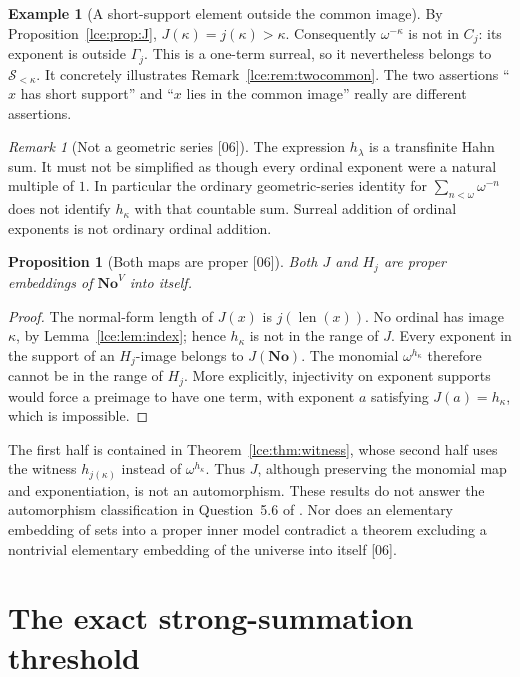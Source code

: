 \documentclass[11pt,letterpaper]{article}
\numberwithin{equation}{section}
\newtheorem{proposition}[theorem]{Proposition}
\theoremstyle{definition}
\newtheorem{example}[theorem]{Example}
\theoremstyle{remark}
\newtheorem{remark}[theorem]{Remark}
\newcommand{\No}{\mathbf{No}}
\newcommand{\len}{\operatorname{len}}
\newcommand{\Sk}{\mathscr S_{<\kappa}}
\newcommand{\Gam}{\Gamma_j}
\newcommand{\Common}{C_j}
\newcommand{\thref}[1]{Theorem~\ref{#1}}
\newcommand{\prref}[1]{Proposition~\ref{#1}}
\newcommand{\leref}[1]{Lemma~\ref{#1}}
\newcommand{\src}[1]{\textup{\textsf{\small[#1]}}}%
\begin{document}
\begin{example}[A short-support element outside the common image]
By \prref{lce:prop:J}, $J(\kappa)=j(\kappa)>\kappa$. Consequently
$\omega^{-\kappa}$ is not in $\Common$: its exponent is outside $\Gam$.
This is a one-term surreal, so it nevertheless belongs to $\Sk$.
It concretely illustrates Remark~\ref{lce:rem:twocommon}. The two assertions
``$x$ has short support'' and ``$x$ lies in the common image'' really are
different assertions.
\end{example}

\begin{remark}[Not a geometric series \src{06}]\label{lce:cs:rem:geometric}
The expression $h_\lambda$ is a transfinite Hahn sum. It must not be
simplified as though every ordinal exponent were a natural multiple of $1$.
In particular the ordinary geometric-series identity for
$\sum_{n<\omega}\omega^{-n}$ does not identify $h_\kappa$ with that
countable sum. Surreal addition of ordinal exponents is not ordinary
ordinal addition.
\end{remark}

\begin{proposition}[Both maps are proper \src{06}]\label{lce:cs:prop:proper}
Both $J$ and $H_j$ are proper embeddings of $\No^V$ into itself.
\end{proposition}
\begin{proof}
The normal-form length of $J(x)$ is $j(\len(x))$. No ordinal has image
$\kappa$, by \leref{lce:lem:index}; hence $h_\kappa$ is not in the range of
$J$. Every exponent in the support of an $H_j$-image belongs to $J(\No)$.
The monomial $\omega^{h_\kappa}$ therefore cannot be in the range of $H_j$.
More explicitly, injectivity on exponent supports would force a preimage to
have one term, with exponent $a$ satisfying $J(a)=h_\kappa$, which is
impossible.
\end{proof}
The first half is contained in \thref{lce:thm:witness}, whose second half
uses the witness $h_{j(\kappa)}$ instead of $\omega^{h_\kappa}$. Thus $J$,
although preserving the monomial map and exponentiation, is not an
automorphism. These results do not answer the automorphism classification
in Question~5.6 of \cite{KKS}. Nor does an elementary embedding of sets into
a proper inner model contradict a theorem excluding a nontrivial elementary
embedding of the universe into itself \src{06}.

\section{The exact strong-summation threshold}\label{lce:sec:positive}
\end{document}
